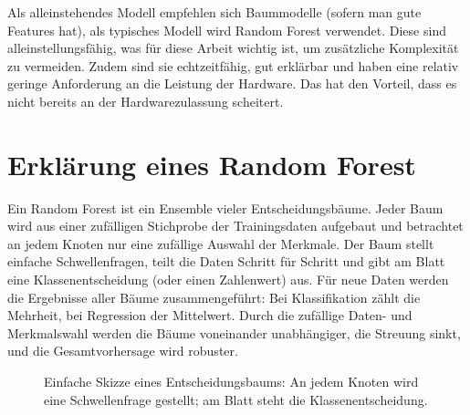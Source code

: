 Als alleinstehendes Modell empfehlen sich Baummodelle (sofern man gute Features hat), als typisches Modell wird Random Forest verwendet. 
Diese sind alleinstellungsfähig, was für diese Arbeit wichtig ist, um zusätzliche Komplexität zu vermeiden. 
Zudem sind sie echtzeitfähig, gut erklärbar und haben eine relativ geringe Anforderung an die Leistung der Hardware. 
Das hat den Vorteil, dass es nicht bereits an der Hardwarezulassung scheitert.

\section{Erklärung eines Random Forest}
Ein Random Forest ist ein Ensemble vieler Entscheidungsbäume. Jeder Baum wird aus einer zufälligen Stichprobe 
der Trainingsdaten aufgebaut und betrachtet an jedem Knoten nur eine zufällige Auswahl der Merkmale. Der Baum 
stellt einfache Schwellenfragen, teilt die Daten Schritt für Schritt und gibt am Blatt eine Klassenentscheidung 
(oder einen Zahlenwert) aus. Für neue Daten werden die Ergebnisse aller Bäume zusammengeführt: Bei Klassifikation 
zählt die Mehrheit, bei Regression der Mittelwert. Durch die zufällige Daten- und Merkmalswahl werden die Bäume 
voneinander unabhängiger, die Streuung sinkt, und die Gesamtvorhersage wird robuster.

\begin{figure}[h!]
\centering
{}
\caption{Einfache Skizze eines Entscheidungsbaums: An jedem Knoten wird eine Schwellenfrage gestellt; am Blatt steht die Klassenentscheidung.}
\end{figure}

